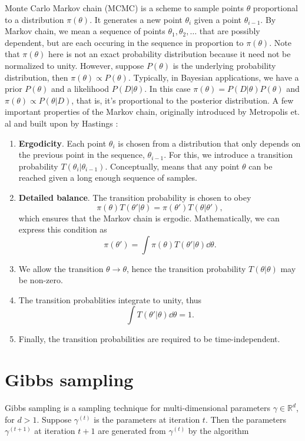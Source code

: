 Monte Carlo Markov chain (MCMC) is a scheme to sample points $\theta$ proportional to a distribution $\pi(\theta)$. It generates a new point $\theta_i$ given a point $\theta_{i-1}$. 
By Markov chain, we mean a sequence of points $\theta_1, \theta_2, \ldots$ that are possibly dependent, but are each occuring in the sequence in proportion to $\pi(\theta)$. Note that $\pi(\theta)$ here is not an exact probability distribution because it need not be normalized to unity.
However, suppose $P(\theta)$ is the underlying probability distribution, then $\pi(\theta) \propto P(\theta)$. Typically, in Bayesian applications, we have a prior $P(\theta)$ and a likelihood $P(D|\theta)$. In this case $\pi(\theta) = P(D|\theta)P(\theta)$ and 
$\pi(\theta) \propto P(\theta|D)$, that is, it's proportional to the posterior distribution. 
A few important properties of the Markov chain, originally introduced by Metropolis et. al and built upon by Hastings \cite{metropolis}:
\begin{enumerate}
  \item \textbf{Ergodicity}. Each point $\theta_i$ is chosen from a distribution that only depends on the previous point in the sequence, $\theta_{i-1}$. For this, we introduce a transition probability $T(\theta_i|\theta_{i-1})$. Conceptually,
  means that any point $\theta$ can be reached given a long enough sequence of samples.
  \item \textbf{Detailed balance}. The transition probability is chosen to obey $$\pi(\theta)T(\theta'|\theta) = \pi(\theta')T(\theta|\theta'),$$ which ensures that the Markov chain is ergodic. Mathematically, we can express this condition as
  $$\pi(\theta') = \int \pi(\theta)T(\theta'|\theta)\dd\theta.$$
  \item We allow the transition $\theta \to \theta$, hence the transition probability $T(\theta|\theta)$ may be non-zero.
  \item The transition probablities integrate to unity, thus $$\int T(\theta'|\theta)\dd\theta = 1.$$
  \item Finally, the transition probabilities are required to be time-independent.
\end{enumerate}


\section{Gibbs sampling}
Gibbs sampling \cite{gibbs} is a sampling technique for multi-dimensional parameters $\gamma \in \mathbb{R}^d$, for $d > 1$.
Suppose $\gamma^{(t)}$ is the parameters at iteration $t$. Then the parameters $\gamma^{(t+1)}$ at iteration $t+1$ are generated from $\gamma^{(t)}$ by the algorithm

